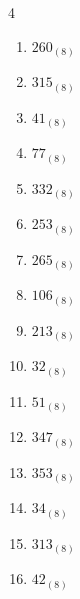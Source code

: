 \begin{multicols}{4}
\begin{enumerate}
  \item $260_{(8)}$

        \phantom{$=176$}

  \item $315_{(8)}$

        \phantom{$=205$}

  \item $41_{(8)}$

        \phantom{$=33$}

  \item $77_{(8)}$

        \phantom{$=63$}

  \item $332_{(8)}$

        \phantom{$=218$}

  \item $253_{(8)}$

        \phantom{$=171$}

\columnbreak %

  \item $265_{(8)}$

        \phantom{$=181$}

  \item $106_{(8)}$

        \phantom{$=70$}

  \item $213_{(8)}$

        \phantom{$=139$}

  \item $32_{(8)}$

        \phantom{$=26$}

  \item $51_{(8)}$

        \phantom{$=41$}

  \item $347_{(8)}$

        \phantom{$=231$}

  \item $353_{(8)}$

        \phantom{$=235$}

  \item $34_{(8)}$

        \phantom{$=28$}

  \item $313_{(8)}$

        \phantom{$=203$}

  \item $42_{(8)}$


\end{enumerate}
\end{multicols}

